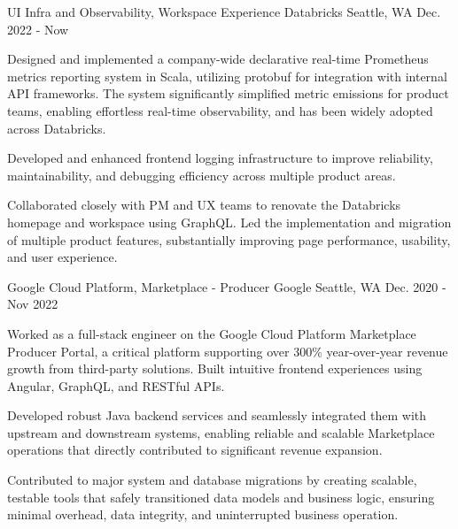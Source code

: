


\begin{cventries}


	\cventry
	{UI Infra and Observability, Workspace Experience} %
	{Databricks} %
	{Seattle, WA} %
	{Dec. 2022 - Now} %
	{
		\begin{cvitems}
			\item{Designed and implemented a company-wide declarative real-time Prometheus metrics reporting system in Scala, utilizing protobuf for integration with internal API frameworks. The system significantly simplified metric emissions for product teams, enabling effortless real-time observability, and has been widely adopted across Databricks.} %
			\item{Developed and enhanced frontend logging infrastructure to improve reliability, maintainability, and debugging efficiency across multiple product areas.} %
			\item{Collaborated closely with PM and UX teams to renovate the Databricks homepage and workspace using GraphQL. Led the implementation and migration of multiple product features, substantially improving page performance, usability, and user experience.}
		\end{cvitems}
	} 


	\cventry
	{Google Cloud Platform, Marketplace - Producer} %
	{Google} %
	{Seattle, WA} %
	{Dec. 2020 - Nov 2022} %
	{
		\begin{cvitems}
			\item{Worked as a full-stack engineer on the Google Cloud Platform Marketplace Producer Portal, a critical platform supporting over 300\% year-over-year revenue growth from third-party solutions. Built intuitive frontend experiences using Angular, GraphQL, and RESTful APIs.} %
			\item{Developed robust Java backend services and seamlessly integrated them with upstream and downstream systems, enabling reliable and scalable Marketplace operations that directly contributed to significant revenue expansion.} %
			\item{Contributed to major system and database migrations by creating scalable, testable tools that safely transitioned data models and business logic, ensuring minimal overhead, data integrity, and uninterrupted business operation.} %
		\end{cvitems}
	}


\end{cventries}
